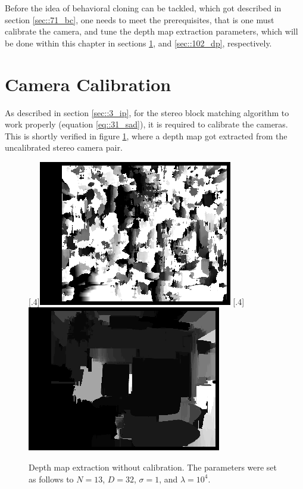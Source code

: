 
\label{sec::10_ip}
Before the idea of behavioral cloning can be tackled, which got described in section \ref{sec::71_bc}, one needs to meet the prerequisites, that is one must calibrate the camera, and tune the depth map extraction parameters, which will be done within this chapter in sections \ref{sec::10_cc}, and \ref{sec::102_dp}, respectively.
\FloatBarrier
\section{Camera Calibration}
\label{sec::10_cc}
As described in section \ref{sec::3_ip}, for the stereo block matching algorithm to work properly (equation \ref{eq::31_sad}), it is required to calibrate the cameras. This is shortly verified in figure \ref{fig::101_no_calib}, where a depth map got extracted from the uncalibrated stereo camera pair.
\begin{figure}[h!]
	\centering
	[.4\linewidth]{\includegraphics[scale=.3]{chapters/10_image_processing_experiments/img/disp_no_calib.png}}
	[.4\linewidth]{\includegraphics[scale=.3]{chapters/10_image_processing_experiments/img/wls_no_calib.png}}
	\caption{Depth map extraction without calibration. The parameters were set as follows to $N=13$, $D=32$, $\sigma = 1$, and $\lambda=10^4$.}
	\label{fig::101_no_calib}
\end{figure}
